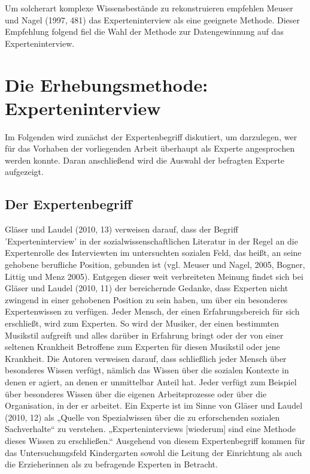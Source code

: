Um solcherart komplexe Wissensbestände zu rekonstruieren empfehlen Meuser und Nagel (1997, 481) das Experteninterview als eine geeignete Methode. Dieser Empfehlung folgend fiel die Wahl der Methode zur Datengewinnung auf das Experteninterview. 


\section{Die Erhebungsmethode: Experteninterview}
Im Folgenden wird zunächst der Expertenbegriff diskutiert, um darzulegen, wer für das Vorhaben der vorliegenden Arbeit überhaupt als Experte angesprochen werden konnte.
Daran anschließend wird die Auswahl der befragten Experte aufgezeigt. 

\subsection{Der Expertenbegriff}
Gläser und Laudel (2010, 13) verweisen darauf, dass der Begriff ’Experteninterview’ in der sozialwissenschaftlichen Literatur in der Regel an die Expertenrolle des Interviewten im untersuchten sozialen Feld, das heißt, an seine gehobene berufliche Position, gebunden ist (vgl. Meuser und Nagel, 2005, Bogner, Littig und Menz 2005). Entgegen dieser weit verbreiteten Meinung findet sich bei Gläser und Laudel (2010, 11) der bereichernde Gedanke, dass Experten nicht zwingend in einer gehobenen Position zu sein haben, um über ein besonderes Expertenwissen zu verfügen. Jeder Mensch, der einen Erfahrungsbereich für sich erschließt, wird zum Experten. So wird der Musiker, der einen bestimmten Musikstil aufgreift und alles darüber in Erfahrung bringt oder der von einer seltenen Krankheit Betroffene zum Experten für diesen Musikstil oder jene Krankheit. Die Autoren verweisen darauf, dass schließlich jeder Mensch über besonderes Wissen verfügt, nämlich das Wissen über die sozialen Kontexte in denen er agiert, an denen er unmittelbar Anteil hat. Jeder verfügt zum Beispiel über besonderes Wissen über die eigenen Arbeitsprozesse oder über die Organisation, in der er arbeitet. Ein Experte ist im Sinne von Gläser und Laudel (2010, 12) als „Quelle von Spezialwissen über die zu erforschenden sozialen Sachverhalte“ zu verstehen. „Experteninterviews [wiederum] sind eine Methode dieses Wissen zu erschließen.“ Ausgehend von diesem Expertenbegriff kommen für das Untersuchungsfeld Kindergarten sowohl die Leitung der Einrichtung als auch die Erzieherinnen als zu befragende Experten in Betracht. 
 
